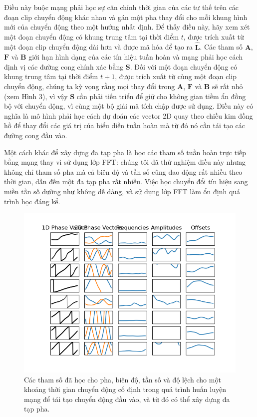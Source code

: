 Điều này buộc mạng phải học sự căn chỉnh thời gian của các tư thế trên các đoạn clip chuyển động khác nhau và gán một pha thay đổi cho mỗi khung hình mới của chuyển động theo một hướng nhất định. Để thấy điều này, hãy xem xét một đoạn chuyển động có khung trung tâm tại thời điểm $t$, được trích xuất từ một đoạn clip chuyển động dài hơn và được mã hóa để tạo ra $\hat{\textbf{L}}$. Các tham số $\textbf{A}$, $\textbf{F}$ và $\textbf{B}$ giới hạn hình dạng của các tín hiệu tuần hoàn và mạng phải học cách định vị các đường cong chính xác bằng $\textbf{S}$. Đối với một đoạn chuyển động có khung trung tâm tại thời điểm $t + 1$, được trích xuất từ cùng một đoạn clip chuyển động, chúng ta kỳ vọng rằng mọi thay đổi trong $\textbf{A}$, $\textbf{F}$ và $\textbf{B}$ sẽ rất nhỏ (xem Hình 3), vì vậy $\textbf{S}$ cần phải tiến triển để giữ cho không gian tiềm ẩn đồng bộ với chuyển động, vì cùng một bộ giải mã tích chập được sử dụng. Điều này có nghĩa là mô hình phải học cách dự đoán các vector 2D quay theo chiều kim đồng hồ để thay đổi các giá trị của biểu diễn tuần hoàn mà từ đó nó cần tái tạo các đường cong đầu vào.

Một cách khác để xây dựng đa tạp pha là học các tham số tuần hoàn trực tiếp bằng mạng thay vì sử dụng lớp FFT: chúng tôi đã thử nghiệm điều này nhưng không chỉ tham số pha mà cả biên độ và tần số cũng dao động rất nhiều theo thời gian, dẫn đến một đa tạp pha rất nhiễu. Việc học chuyển đổi tín hiệu sang miền tần số dường như không dễ dàng, và sử dụng lớp FFT làm ổn định quá trình học đáng kể.

\begin{figure}
	\centering
	\includegraphics[width=\linewidth]{images/phase_bias_frequency_amplitudes_offsets.png}
	\caption{Các tham số đã học cho pha, biên độ, tần số và độ lệch cho một khoảng thời gian chuyển động cố định trong quá trình huấn luyện mạng để tái tạo chuyển động đầu vào, và từ đó có thể xây dựng đa tạp pha.}
	\label{fig:phase_bias_frequency_amplitudes_offsets}
\end{figure}

